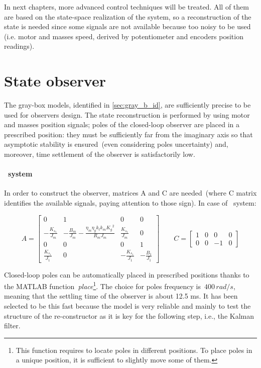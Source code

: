 
In next chapters, more advanced control techniques will be treated. All of them are based on the state-space realization of the system, so a reconstruction of the state is needed since some signals are not available because too noisy to be used (i.e. motor and masses speed, derived by potentiometer and encoders position readings).

\section{State observer}

The gray-box models, identified in \cref{sec:gray_b_id}, are sufficiently precise to be used for observers design. The state reconstruction is performed by using motor and masses position signals; poles of the closed-loop observer are placed in a prescribed position: they must be sufficiently far from the imaginary axis so that asymptotic stability is ensured~(even considering poles uncertainty) and, moreover, time settlement of the observer is satisfactorily low.

\paragraph{\onedof\ system}

In order to construct the observer, matrices A and C are needed~(where C matrix identifies the available signals, paying attention to those sign). In case of \onedof\ system:

\begin{equation}
	A = 
	\begin{bmatrix}
		0 &1 & 0 & 0 \\
		-\frac{K_{s_1}}{J_m} & -\frac{B_m}{J_m}-\frac{\eta_m \eta_g k_t k_m {K_g}^2}{R_m J_m}  & \frac{K_{s_1}}{J_m} & 0 \\
		0 & 0 & 0 & 1 \\
		\frac{K_{s_1}}{J_1} & 0 & -\frac{K_{s_1}}{J_1} & -\frac{B_1}{J_1}
	\end{bmatrix}
	\qquad
	C =
	\begin{bmatrix}
		1 & 0 & 0 & 0 \\
		0 & 0 & -1 & 0
	\end{bmatrix}
\label{eqn:1dof_mat_obs}
\end{equation}

Closed-loop poles can be automatically placed in prescribed positions thanks to the MATLAB function~\textit{place}\footnote{This function requires to locate poles in different positions. To place poles in a unique position, it is sufficient to slightly move some of them.}.
The choice for poles frequency is~$400 \, rad/s$, meaning that the settling time of the observer is about 12.5 ms. It has been selected to be this fast because the model is very reliable and mainly to test the structure of the re-constructor as it is key for the following step, i.e., the Kalman filter. 

